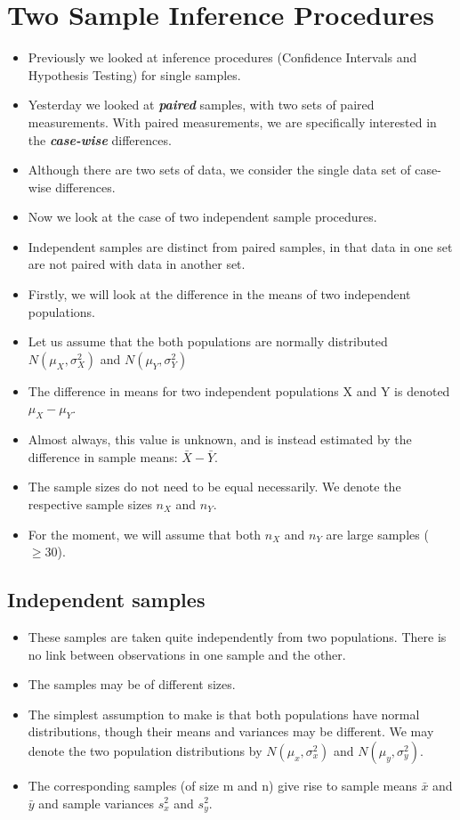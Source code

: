 \documentclass[]{report}
\begin{document}
\section{Two Sample Inference Procedures}
\begin{itemize}
\item Previously we looked at inference procedures (Confidence Intervals and Hypothesis Testing) for single samples.
\item Yesterday we looked at \textit{\textbf{paired}} samples, with two sets of paired measurements. With paired measurements, we are specifically interested in the \textbf{\textit{case-wise}} differences.
\item Although there are two sets of data, we consider the single data set of case-wise differences.
\item Now we look at the case of two independent sample procedures.
\item Independent samples are distinct from paired samples, in that data in one set are not paired with data in another set.

\item Firstly, we will look at the difference in the means of two independent populations.
\item Let us assume that the both populations are normally distributed $N(\mu_X,\sigma^2_X)$ and $N(\mu_Y,\sigma^2_Y)$
\item The difference in means for two independent populations X and Y is denoted $\mu_X - \mu_Y$.
\item Almost always, this value is unknown, and is instead estimated by the difference in sample means: $\bar{X} - \bar{Y}.$
\item The sample sizes do not need to be equal necessarily. We denote the respective sample sizes $n_X$ and $n_Y$.
\item For the moment, we will assume that both $n_X$ and $n_Y$ are large samples ($ \geq 30$).
\end{itemize}



\subsection{Independent samples}
\begin{itemize}
\item These samples are taken quite independently from two populations. There is no link
between observations in one sample and the other. \item The samples may be of different
sizes. \item The simplest assumption to make is that both populations have normal distributions,
though their means and variances may be different. We may denote the two
population distributions by $N(\mu_x, \sigma^2_x )$ and $N(\mu_y, \sigma^2_y )$. \item The corresponding samples
(of size m and n) give rise to sample means $\bar{x}$ and $\bar{y}$ and sample variances $s^2_x$
and $s^2_y$.

\end{itemize}
\end{document}
